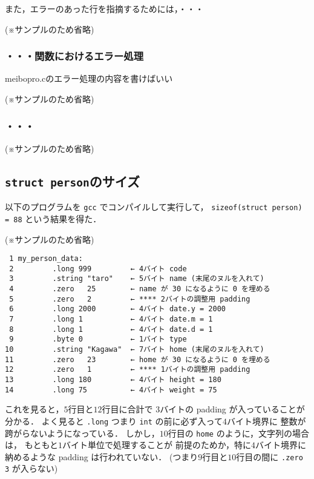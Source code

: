\documentclass[a4j,11pt]{jarticle}
\begin{document}
また，エラーのあった行を指摘するためには，・・・

(※サンプルのため省略)

\subsubsection{・・・関数におけるエラー処理}
meibopro.cのエラー処理の内容を書けばいい

(※サンプルのため省略)

\subsubsection{・・・}

(※サンプルのため省略)


\subsection{\texttt{struct person}のサイズ}

以下のプログラムを \verb|gcc| でコンパイルして実行して，
\verb|sizeof(struct person) = 88| という結果を得た．

(※サンプルのため省略)

{\fontsize{10pt}{11pt} \selectfont
 \begin{verbatim}
 1 my_person_data:
 2         .long 999         ← 4バイト code
 3         .string "taro"    ← 5バイト name (末尾のヌルを入れて)
 4         .zero   25        ← name が 30 になるように 0 を埋める
 5         .zero   2         ← **** 2バイトの調整用 padding
 6         .long 2000        ← 4バイト date.y = 2000
 7         .long 1           ← 4バイト date.m = 1
 8         .long 1           ← 4バイト date.d = 1
 9         .byte 0           ← 1バイト type
10         .string "Kagawa"  ← 7バイト home (末尾のヌルを入れて)
11         .zero   23        ← home が 30 になるように 0 を埋める
12         .zero   1         ← **** 1バイトの調整用 padding
13         .long 180         ← 4バイト height = 180
14         .long 75          ← 4バイト weight = 75
 \end{verbatim}
}

これを見ると，$5$行目と$12$行目に合計で
$3$バイトの padding が入っていることが分かる．
よく見ると \verb|.long| つまり \verb|int| の前に必ず入って$4$バイト境界に
整数が跨がらないようになっている．
しかし，$10$行目の \verb|home| のように，文字列の場合は，
もともと$1$バイト単位で処理することが
前提のためか，特に$4$バイト境界に納めるような padding は行われていない．
(つまり$9$行目と$10$行目の間に \verb|.zero 3| が入らない)
\end{document}
